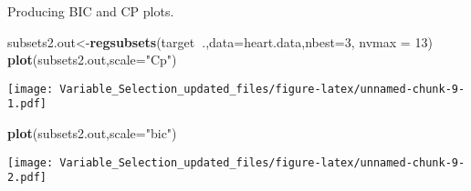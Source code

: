 \documentclass[]{article}
\newenvironment{Shaded}{\begin{snugshade}}{\end{snugshade}}
\newcommand{\DataTypeTok}[1]{\textcolor[rgb]{0.13,0.29,0.53}{#1}}
\newcommand{\DecValTok}[1]{\textcolor[rgb]{0.00,0.00,0.81}{#1}}
\newcommand{\KeywordTok}[1]{\textcolor[rgb]{0.13,0.29,0.53}{\textbf{#1}}}
\newcommand{\NormalTok}[1]{#1}
\newcommand{\OperatorTok}[1]{\textcolor[rgb]{0.81,0.36,0.00}{\textbf{#1}}}
\newcommand{\StringTok}[1]{\textcolor[rgb]{0.31,0.60,0.02}{#1}}
\begin{document}
Producing BIC and CP plots.

\begin{Shaded}
\begin{Highlighting}[]
\NormalTok{subsets2.out<-}\KeywordTok{regsubsets}\NormalTok{(target}\OperatorTok{~}\NormalTok{.,}\DataTypeTok{data=}\NormalTok{heart.data,}\DataTypeTok{nbest=}\DecValTok{3}\NormalTok{, }\DataTypeTok{nvmax =} \DecValTok{13}\NormalTok{)}
\KeywordTok{plot}\NormalTok{(subsets2.out,}\DataTypeTok{scale=}\StringTok{"Cp"}\NormalTok{)}
\end{Highlighting}
\end{Shaded}

\texttt{[image: Variable\_Selection\_updated\_files/figure-latex/unnamed-chunk-9-1.pdf]}

\begin{Shaded}
\begin{Highlighting}[]
\KeywordTok{plot}\NormalTok{(subsets2.out,}\DataTypeTok{scale=}\StringTok{"bic"}\NormalTok{)}
\end{Highlighting}
\end{Shaded}

\texttt{[image: Variable\_Selection\_updated\_files/figure-latex/unnamed-chunk-9-2.pdf]}
\end{document}
